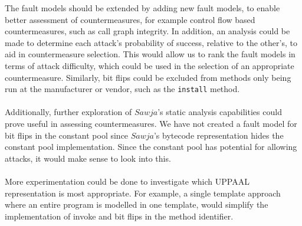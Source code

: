 The fault models should be extended by adding new fault models, to enable better assessment of countermeasures, for example control flow based countermeasures, such as call graph integrity. In addition, an analysis could be made to determine each attack's probability of success, relative to the other's, to aid in countermeasure selection. This would allow us to rank the fault models in terms of attack difficulty, which could be used in the selection of an appropriate countermeasure. Similarly, bit flips could be excluded from methods only being run at the manufacturer or vendor, such as the \texttt{install} method.\\\\
Additionally, further exploration of $Sawja$'s static analysis capabilities could prove useful in assessing countermeasures. We have not created a fault model for bit flips in the constant pool since $Sawja$'s bytecode representation hides the constant pool implementation. Since the constant pool has potential for allowing attacks, it would make sense to look into this.\\\\
More experimentation could be done to investigate which UPPAAL representation is most appropriate. For example, a single template approach where an entire program is modelled in one template, would simplify  the implementation of invoke and bit flips in the method identifier.

